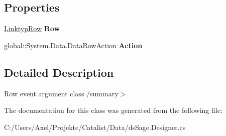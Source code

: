 \subsection*{Properties}
\begin{DoxyCompactItemize}
\item 
\hyperlink{class_products_1_1_data_1_1ds_sage_1_1_linktyp_row}{Linktyp\+Row} {\bfseries Row}\hypertarget{class_products_1_1_data_1_1ds_sage_1_1_linktyp_row_change_event_acd98135e28e4379d1a68551fb012bce3}{}\label{class_products_1_1_data_1_1ds_sage_1_1_linktyp_row_change_event_acd98135e28e4379d1a68551fb012bce3}

\item 
global\+::\+System.\+Data.\+Data\+Row\+Action {\bfseries Action}\hypertarget{class_products_1_1_data_1_1ds_sage_1_1_linktyp_row_change_event_ac876be447744d2a7b27951b019420031}{}\label{class_products_1_1_data_1_1ds_sage_1_1_linktyp_row_change_event_ac876be447744d2a7b27951b019420031}

\end{DoxyCompactItemize}


\subsection{Detailed Description}
Row event argument class /summary$>$ 

The documentation for this class was generated from the following file\+:\begin{DoxyCompactItemize}
\item 
C\+:/\+Users/\+Axel/\+Projekte/\+Catalist/\+Data/ds\+Sage.\+Designer.\+cs\end{DoxyCompactItemize}

